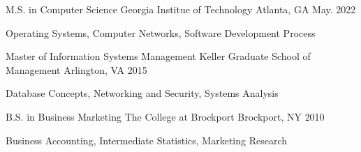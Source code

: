

\begin{cventries}

  \cventry
    {M.S. in Computer Science} %
    {Georgia Institue of Technology} %
    {Atlanta, GA} %
    {May. 2022} %
    {
      \begin{cvitems} %
        \item {Operating Systems, Computer Networks, Software Development Process}
      \end{cvitems}
    }

  \cventry
    {Master of Information Systems Management} %
    {Keller Graduate School of Management} %
    {Arlington, VA} %
    {2015} %
    {
      \begin{cvitems} %
        \item {Database Concepts, Networking and Security, Systems Analysis}
      \end{cvitems}
    }
  \cventry
    {B.S. in Business Marketing} %
    {The College at Brockport} %
    {Brockport, NY} %
    {2010} %
    {
      \begin{cvitems} %
        \item {Business Accounting, Intermediate Statistics, Marketing Research}
      \end{cvitems}
    }
\end{cventries}
